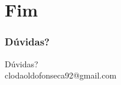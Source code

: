\documentclass{beamer}
\begin{document}
\section[]{Fim}

\begin{frame}
\frametitle{Dúvidas?}
\begin{center}
    Dúvidas?\\
    clodaoldofonseca92@gmail.com
\end{center}

\end{frame}
\end{document}
